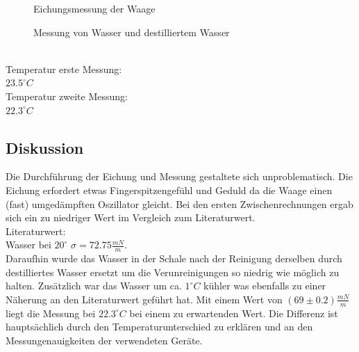 \documentclass[12pt,a4paper]{article}
\begin{document}
\begin{multicols}{2}


\begin{figure}[H]
	\centering
	\caption{Eichungsmessung der Waage}
	\label{fig:oberflaeche_eichung}
\end{figure}
\noindent

\begin{figure}[H]
	\centering
	\caption{Messung von Wasser und destilliertem Wasser}
	\label{fig:oberflaeche_messung}
\end{figure}
\noindent
\\
Temperatur erste Messung:\\
$23.5^{\circ}C$\\
Temperatur zweite Messung:\\
$22.3^{\circ}C$\\
\subsection{Diskussion}
Die Durchführung der Eichung und Messung gestaltete sich unproblematisch. Die Eichung erfordert etwas Fingerspitzengefühl und Geduld da die Waage einen (fast) umgedämpften Oszillator gleicht. Bei den ersten Zwischenrechnungen ergab sich ein zu niedriger Wert im Vergleich zum Literaturwert. \\
Literaturwert: \\
Wasser bei $20^{\circ}$ $\sigma = 72.75 \frac{mN}{m}$.\\
Daraufhin wurde das Wasser in der Schale nach der Reinigung derselben durch destilliertes Wasser ersetzt um die Verunreinigungen so niedrig wie möglich zu halten. Zusätzlich war das Wasser um ca. $1^{\circ}C$ kühler was ebenfalls zu einer Näherung an den Literaturwert geführt hat. Mit einem Wert von $(69 \pm 0.2) \frac{mN}{m}$ liegt die Messung bei $22.3^{\circ}C$ bei einem zu erwartenden Wert. Die Differenz ist hauptsächlich durch den Temperaturunterschied zu erklären und an den Messungenauigkeiten der verwendeten Geräte. %


\end{multicols}
\end{document}
